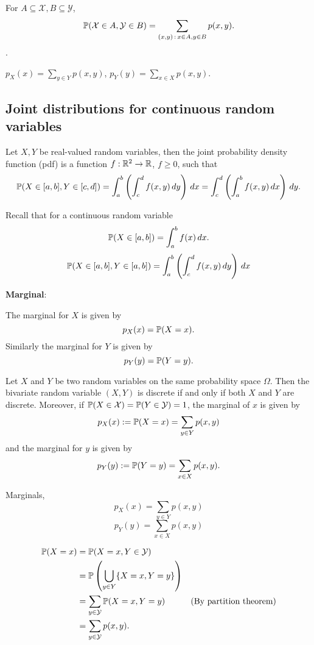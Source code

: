 \documentclass[10pt, a4paper]{article}
\begin{document}
For $A \subseteq \mathcal{X}, B \subseteq \mathcal{Y}$,
\[
\P(\mathcal{X} \in A, \mathcal{Y} \in B) = \sum_{(x, y)\,:\,x \in A, y \in B}p(x, y).
\].

\begin{theorem}
    $p_X(x) = \sum_{y \in Y}p(x, y)$, $p_Y(y) = \sum_{x \in X}p(x, y)$.
\end{theorem}


\subsection{Joint distributions for continuous random variables}
\begin{definition}
    Let $X, Y$ be real-valued random variables,
    then the joint probability density function
    (pdf)
    is a function $f : \R ^ 2 \rightarrow \R$,
    $f \geq 0$,
    such that
    \[
    \P(X \in [a, b], Y \in [c, d]) = \int_{a}^{b}\left(\int_{c}^{d}f(x, y)\,dy\right)\,dx = \int_{c}^{d}\left(\int_{a}^{b}f(x, y)\,dx\right)\,dy.
    \]
\end{definition}

Recall that for a continuous random variable
\[
\P(X \in [a, b]) = \int_{a}^{b}f(x)\,dx.
\]
\[
\P(X \in [a, b], Y \in [a, b]) = \int_{a}^{b}\left(\int_{c}^{d}f(x, y)\,dy\right)\,dx
\]

\textbf{Marginal}:

The marginal for $X$ is given by
\[
p_X(x) = \P(X = x).
\]
Similarly the marginal for $Y$ is given by
\[
p_Y(y) = \P(Y = y).
\]

\begin{theorem}
    Let $X$ and $Y$ be two random variables on the same probability space $\Omega$.
    Then the bivariate random variable $(X, Y)$ is discrete if and only if both $X$ and $Y$ are discrete.
    Moreover,
    if $\P(X \in \mathcal{X}) = \P(Y \in \mathcal{Y}) = 1$,
    the marginal of $x$ is given by
    \[
    p_X(x) := \P(X = x) = \sum_{y \in Y} p(x, y)
    \]
    and the marginal for $y$ is given by
    \[
    p_Y(y) := \P(Y = y) = \sum_{x \in X} p(x, y).
    \]
\end{theorem}

Marginals,
\[
p_X(x) = \sum_{y \in Y}p(x, y)
\]
\[
p_Y(y) = \sum_{x \in X}p(x, y)
\]


\begin{align*}
    \P(X = x) &= \P(X = x, Y \in \mathcal{Y}) \\
    &= \P\left(\bigcup_{y \in Y}\{X = x, Y = y\}\right) \\
    &= \sum_{y \in \mathcal{Y}}\P(X = x, Y = y) & \text{(By partition theorem)} \\
    &= \sum_{y \in \mathcal{Y}}p(x, y).
\end{align*}
\end{document}
